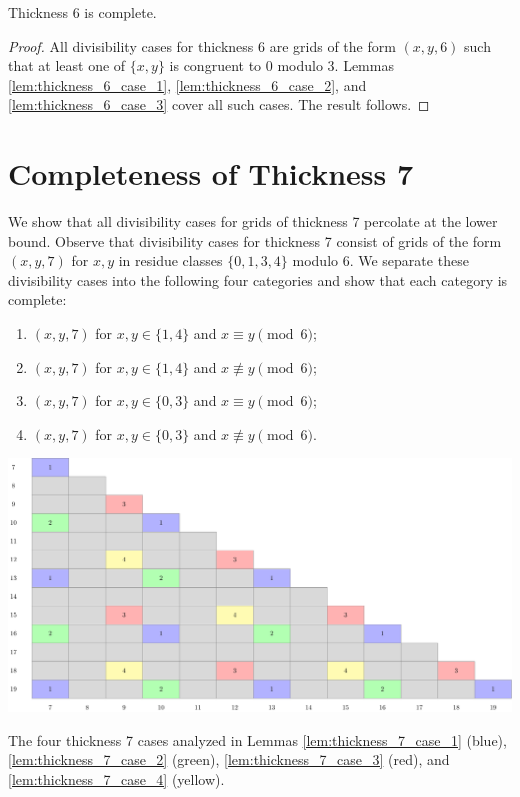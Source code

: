 \begin{lem}
Thickness 6 is complete.
\end{lem}

\begin{proof}
All divisibility cases for thickness 6 are grids of the form $(x,y,6)$ such that at least one of $\{x,y\}$ is congruent to 0 modulo 3. Lemmas \ref{lem:thickness_6_case_1}, \ref{lem:thickness_6_case_2}, and \ref{lem:thickness_6_case_3} cover all such cases. The result follows.
\end{proof}

\section{Completeness of Thickness 7}

We show that all divisibility cases for grids of thickness 7 percolate at the lower bound. Observe that divisibility cases for thickness 7 consist of grids of the form $(x,y,7)$ for $x,y$ in residue classes $\{0,1,3,4\}$ modulo 6. We separate these divisibility cases into the following four categories and show that each category is complete:
\begin{enumerate}
\item $(x,y,7)$ for $x,y \in \{1,4\}$ and $x \equiv y \pmod 6$;
\item $(x,y,7)$ for $x,y \in \{1,4\}$ and $x \not\equiv y \pmod 6$;
\item $(x,y,7)$ for $x,y \in \{0,3\}$ and $x \equiv y \pmod 6$;
\item $(x,y,7)$ for $x,y \in \{0,3\}$ and $x \not\equiv y \pmod 6$.
\end{enumerate}

\begin{table}[]
\centering
\includegraphics[width=\textwidth]{tables/4/thickness_7_cases.pdf}
\caption{The four thickness 7 cases analyzed in Lemmas \ref{lem:thickness_7_case_1} (blue), \ref{lem:thickness_7_case_2} (green), \ref{lem:thickness_7_case_3} (red), and \ref{lem:thickness_7_case_4} (yellow).}
\label{fig:thickness_7_cases}
\end{table}

